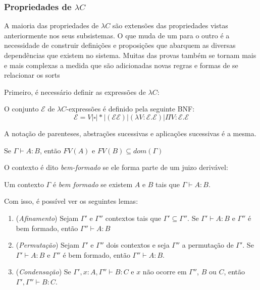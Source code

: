 \documentclass[../main.tex]{subfiles}
\begin{document}
\subsubsection{Propriedades de \texorpdfstring{$\lambda C$}{LC}}

A maioria das propriedades de $\lambda C$ são extensões das propriedades vistas anteriormente nos seus subsistemas. O que muda de um para o outro é a necessidade de construir definições e proposições que abarquem as diversas dependências que existem no sistema. Muitas das provas também se tornam mais e mais complexas a medida que são adicionadas novas regras e formas de se relacionar os sorts

Primeiro, é necessário definir as expressões de $\lambda C$:

\begin{definition}
    O conjunto $\mathcal{E}$ de $\lambda C$-expressões é definido pela seguinte BNF:
    $$\mathcal{E} = V | \square | \ast | (\mathcal{E} \mathcal{E}) | (\lambda V : \mathcal{E} . \mathcal{E}) | \Pi V : \mathcal{E} . \mathcal{E}$$ 
\end{definition}

A notação de parenteses, abstrações sucessivas e aplicações sucessivas é a mesma.

\begin{lemma}
    Se $\Gamma \vdash A : B$, então $FV(A)$ e $FV(B) \subseteq dom(\Gamma)$
\end{lemma}

O contexto é dito \emph{bem-formado} se ele forma parte de um juizo derivável:

\begin{definition}
    Um contexto $\Gamma$ é \emph{bem formado} se existem $A$ e $B$ tais que $\Gamma \vdash A : B$.
\end{definition}

Com isso, é possível ver os seguintes lemas:

\begin{lemma}
    \hfil
    \begin{enumerate}[label=(\arabic*)]
        \item (\emph{Afinamento}) Sejam $\Gamma '$ e $\Gamma ''$ contextos tais que $\Gamma' \subseteq \Gamma ''$. Se $\Gamma ' \vdash A : B$ e $\Gamma ''$ é bem formado, então $\Gamma '' \vdash A : B$
        \item (\emph{Permutação}) Sejam $\Gamma '$ e $\Gamma ''$ dois contextos e seja $\Gamma ''$ a permutação de $\Gamma '$. Se $\Gamma ' \vdash A : B$ e $\Gamma ''$ é bem formado, então $\Gamma '' \vdash A : B$.
        \item (\emph{Condensação}) Se $\Gamma ', x : A, \Gamma '' \vdash B : C$ e $x$ não ocorre em $\Gamma ''$, $B$ ou $C$, então $\Gamma', \Gamma'' \vdash B : C$.
    \end{enumerate}
\end{lemma}
\end{document}

